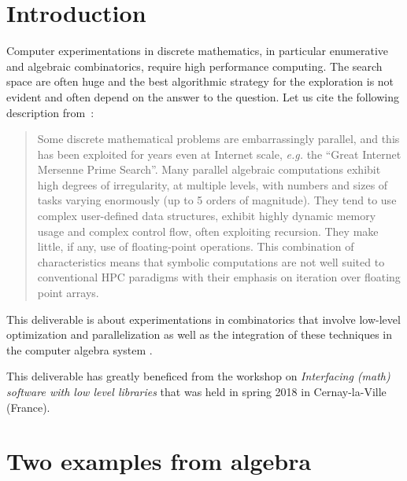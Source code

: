 \documentclass{deliverablereport}
\author{V. Delecroix, F. Hivert}
\begin{document}
\maketitle


\tableofcontents


\section{Introduction}

Computer experimentations in discrete mathematics, in particular
enumerative and algebraic combinatorics, require high performance
computing. The search space are often huge and the best algorithmic
strategy for the exploration is not evident and often depend on
the answer to the question. Let us cite the following description
from~\cite{LoidlTrinder-Hecke}:
\begin{quote}{}
  Some discrete mathematical problems are embarrassingly parallel, and this
  has been exploited for years even at Internet scale, \emph{e.g.} the “Great
  Internet Mersenne Prime Search”.  Many parallel algebraic computations
  exhibit high degrees of irregularity, at multiple levels, with numbers and
  sizes of tasks varying enormously (up to 5 orders of magnitude). They tend
  to use complex user-defined data structures, exhibit highly dynamic memory
  usage and complex control flow, often exploiting recursion. They make
  little, if any, use of floating-point operations.  This combination of
  characteristics means that symbolic computations are not well suited to
  conventional HPC paradigms with their emphasis on iteration over floating
  point arrays.
\end{quote}
This deliverable is about experimentations in combinatorics
that involve low-level optimization and parallelization as
well as the integration of these techniques in the computer
algebra system \Sage.

This deliverable has greatly beneficed from the \ODK workshop
on \textit{Interfacing (math) software with low level libraries}
that was held in spring 2018 in Cernay-la-Ville (France).


\section{Two examples from algebra}
\end{document}
